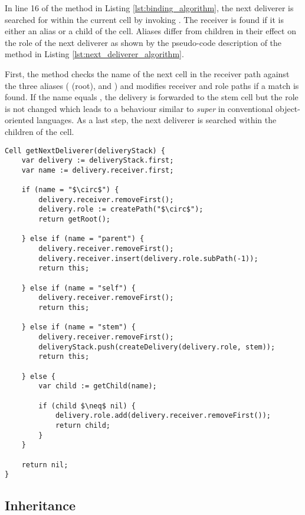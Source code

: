 In line 16 of the  method in Listing \ref{lst:binding_algorithm}, the next deliverer is searched for within the current cell by invoking . The receiver is found if it is either an alias or a child of the cell. Aliases differ from children in their effect on the role of the next deliverer as shown by the pseudo-code description of the  method in Listing \ref{lst:next_deliverer_algorithm}.

First, the method checks the name of the next cell in the receiver path against the three aliases (\cell{$\circ$} (root),  and ) and modifies receiver and role paths if a match is found. If the name equals , the delivery is forwarded to the stem cell but the role is not changed which leads to a behaviour similar to \textit{super} in conventional object-oriented languages. As a last step, the next deliverer is searched within the children of the cell.

\begin{lstlisting}[mathescape, float=htbp, label=lst:next_deliverer_algorithm, 
caption=Alias and child resolution]
Cell getNextDeliverer(deliveryStack) {
	var delivery := deliveryStack.first;
	var name := delivery.receiver.first;
	
	if (name = "$\circ$") {
		delivery.receiver.removeFirst();
		delivery.role := createPath("$\circ$");
		return getRoot();

	} else if (name = "parent") {
		delivery.receiver.removeFirst();
		delivery.receiver.insert(delivery.role.subPath(-1));
		return this;

	} else if (name = "self") {
		delivery.receiver.removeFirst();
		return this;

	} else if (name = "stem") {
		delivery.receiver.removeFirst();
		deliveryStack.push(createDelivery(delivery.role, stem));
		return this;

	} else {
		var child := getChild(name);
		
		if (child $\neq$ nil) {
			delivery.role.add(delivery.receiver.removeFirst());
			return child;
		}
	}
	
	return nil;
}
\end{lstlisting}

\subsection{Inheritance}
\label{sec:inheritance}

